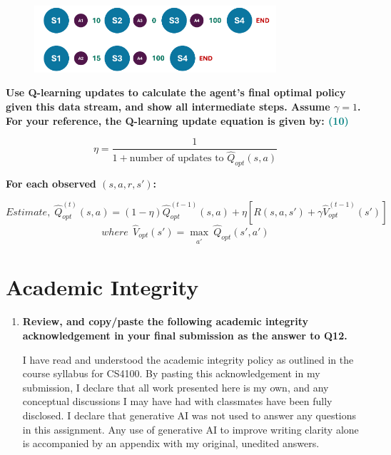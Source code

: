 \documentclass[a4paper]{article}
\begin{document}
\begin{sloppypar}
\begin{enumerate}[start=8,label=Q\arabic*,left=0pt]
    \begin{figure}[H]
        \centering  
        \includegraphics[width=0.8\textwidth]{Q11_mdp.png}
        \label{fig:Q11_mdp}
    \end{figure}

    \textbf{Use Q-learning updates to calculate the agent’s final optimal policy given this data stream,
    and show all intermediate steps. Assume $\gamma = 1$. For your reference, the Q-learning update equation is given by: \hfill \textcolor{teal}{(10)}}
    
    \[ \eta = \frac{1}{1 + \text{number of updates to } \hat{Q}_{opt}(s, a)} \]

    \textbf{For each observed $(s, a, r, s')$:}

    \[ Estimate, \; \hat{Q}^{(t)}_{opt}(s, a) = (1 - \eta) \hat{Q}^{(t-1)}_{opt}(s, a) + \eta[R(s, a, s') + \gamma \hat{V}^{(t-1)}_{opt}(s')] \]
    \[ where \:\: \hat{V}_{opt}(s') = \max_{\substack{a'}} \ \hat{Q}_{opt}(s', a') \]

\end{enumerate}

\section{Academic Integrity}

\begin{enumerate}[start=12,label=Q\arabic*,left=0pt]
    \item \textbf{Review, and copy/paste the following academic integrity acknowledgement in your final submission as the answer to Q12.}
    
    \par I have read and understood the academic integrity policy as outlined in the course syllabus for CS4100. 
    By pasting this acknowledgement in my submission, I declare that all work presented here is my own, and any conceptual 
    discussions I may have had with classmates have been fully disclosed. I declare that generative AI was not used to answer
    any questions in this assignment. Any use of generative AI to improve writing clarity alone is accompanied by an appendix 
    with my original, unedited answers.

\end{enumerate}

\end{sloppypar}



\end{document}
